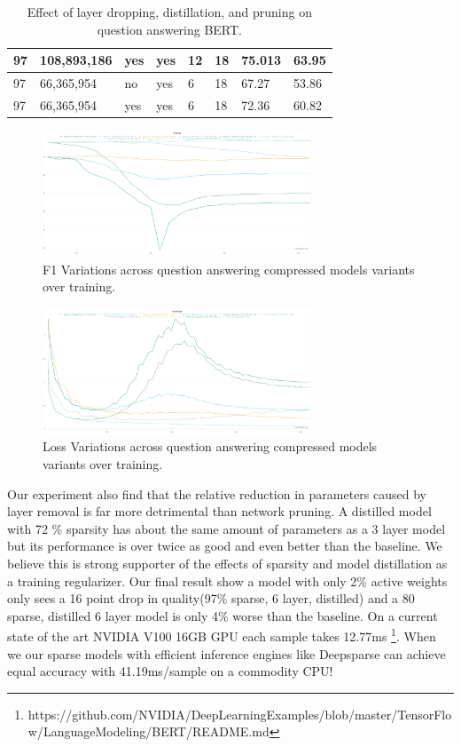 \begin{table}[]
{\begin{tabular}{|l|l|l|l|l|l|l|l|}
97         & 108,893,186            & yes       & yes       & 12           & 18             & 75.013   & 63.95\\ \hline
97         & 66,365,954              & no        & yes       & 6          & 18             & 67.27   & 53.86  \\ \hline
97         & 66,365,954              & yes       & yes       & 6          & 18             & 72.36   & 60.82  \\ \hline
\end{tabular}}
\caption{Effect of layer dropping, distillation, and pruning on question answering BERT.}
\label{tab:qa-all}
\end{table}
\begin{figure}[h]
\centering
\includegraphics[width=8cm]{project/qaf1.png}
\caption{F1 Variations across question answering compressed models variants over training.}
\end{figure}
\begin{figure}[h]
\centering
\includegraphics[width=8cm]{project/qaloss.png}
\caption{Loss Variations across question answering compressed models variants over training.}
\end{figure}
Our experiment also find that the relative reduction in parameters caused by layer removal is far more detrimental than network pruning. A distilled model with 72 \% sparsity has about the same amount of parameters as a 3 layer model but its performance is over twice as good and even better than the baseline. We believe this is strong supporter of the effects of sparsity and model distillation as a training regularizer. Our final result show a model with only 2\% active weights only sees a 16 point drop in quality(97\% sparse, 6 layer, distilled) and a 80 sparse, distilled 6 layer model is only 4\% worse than the baseline. On a current state of the art NVIDIA V100 16GB GPU each sample takes 12.77ms \footnote{https://github.com/NVIDIA/DeepLearningExamples/blob/master/TensorFlow/LanguageModeling/BERT/README.md}. When we our sparse models with efficient inference engines like Deepsparse can achieve equal accuracy with 41.19ms/sample on a commodity CPU!
